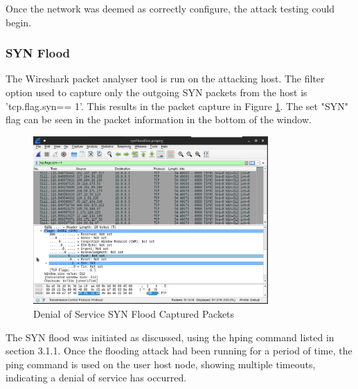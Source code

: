 Once the network was deemed as correctly configure, the attack testing could
begin.

\subsubsection{SYN Flood}

The Wireshark packet analyser tool is run on the attacking host. The filter
option used to capture only the outgoing SYN packets from the host is
'tcp.flag.syn== 1'. This results in the packet capture in Figure
\ref{fig:images-synFloodDosWs}. The set "SYN" flag can be seen in the packet
information in the bottom of the window.

\begin{figure}[H]
	\centering
	\includegraphics[width=0.8\textwidth]{images/synFloodDosWs}
	\caption{Denial of Service SYN Flood Captured Packets}
	\label{fig:images-synFloodDosWs}
\end{figure}

The SYN flood was initiated as discussed, using the hping command listed in
section 3.1.1. Once the flooding attack had been running for a period of time,
the ping command is used on the user host node, showing multiple timeouts,
indicating a denial of service has occurred.

